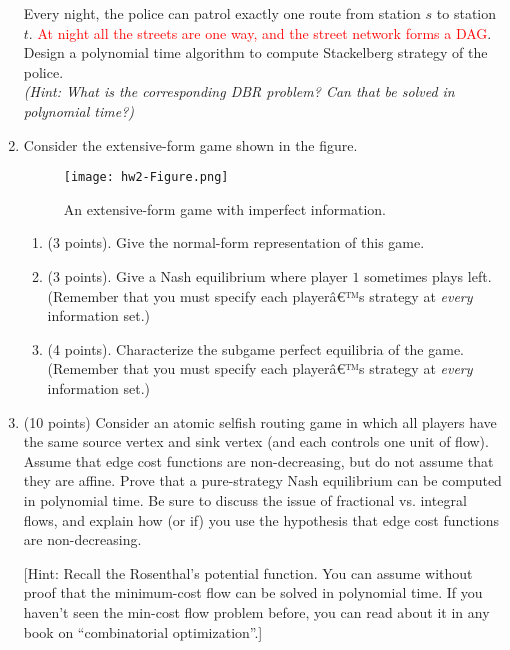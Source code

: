 \documentclass[11pt]{article}
\begin{document}
\begin{enumerate}
Every night, the police can patrol exactly one route from station $s$ to station $t$. \textcolor{red}{At night all the streets are one way, and the street network forms a DAG}. Design a polynomial time algorithm to compute Stackelberg strategy of the police. \\

{\em (Hint: What is the corresponding DBR problem? Can that be solved in polynomial time?)}

\item Consider the extensive-form game shown in the figure.

\begin{figure}[!ht]
\centering
\texttt{[image: hw2-Figure.png]}
\caption{An extensive-form game with imperfect information.}
\end{figure}

\begin{enumerate}
    \item (3 points). Give the normal-form representation of this game.
    \item (3 points). Give a Nash equilibrium where player $1$ sometimes plays left. (Remember that you must specify each playerâ€™s strategy at {\em every} information set.)
    \item (4 points). Characterize the subgame perfect equilibria of the game. (Remember that you must specify each playerâ€™s strategy at {\em every} information set.)
\end{enumerate}

\item (10 points) Consider an atomic selfish routing game in which all players have the same source vertex and sink vertex (and each controls one unit of flow). Assume that edge cost functions are non-decreasing, but do not assume that they are affine. Prove that a pure-strategy Nash equilibrium can be computed in polynomial time. Be sure to discuss the issue of fractional vs. integral flows, and explain how (or if) you use the hypothesis that edge cost functions are non-decreasing.
\medskip

[Hint: Recall the Rosenthal's potential function. You can assume without proof that the minimum-cost flow can be solved in polynomial time. If you haven't seen the min-cost flow problem before, you can read about it in any book on ``combinatorial optimization''.]

\end{enumerate}
\end{document}
